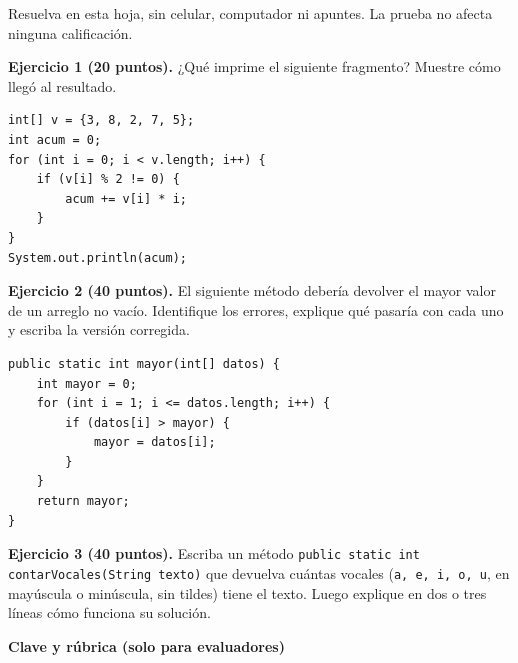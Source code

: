 \documentclass[12pt,letterpaper]{article}
\numberwithin{table}{section}
\numberwithin{figure}{section}
\begin{document}
Resuelva en esta hoja, sin celular, computador ni apuntes. La prueba no afecta ninguna calificación.

\textbf{Ejercicio 1 (20 puntos).} ¿Qué imprime el siguiente fragmento? Muestre cómo llegó al resultado.

\begin{lstlisting}
int[] v = {3, 8, 2, 7, 5};
int acum = 0;
for (int i = 0; i < v.length; i++) {
    if (v[i] % 2 != 0) {
        acum += v[i] * i;
    }
}
System.out.println(acum);
\end{lstlisting}

\textbf{Ejercicio 2 (40 puntos).} El siguiente método debería devolver el mayor valor de un arreglo no vacío. Identifique los errores, explique qué pasaría con cada uno y escriba la versión corregida.

\begin{lstlisting}
public static int mayor(int[] datos) {
    int mayor = 0;
    for (int i = 1; i <= datos.length; i++) {
        if (datos[i] > mayor) {
            mayor = datos[i];
        }
    }
    return mayor;
}
\end{lstlisting}

\textbf{Ejercicio 3 (40 puntos).} Escriba un método \texttt{public static int contarVocales(String texto)} que devuelva cuántas vocales (\texttt{a, e, i, o, u}, en mayúscula o minúscula, sin tildes) tiene el texto. Luego explique en dos o tres líneas cómo funciona su solución.

\medskip
\textbf{Clave y rúbrica (solo para evaluadores)}
\end{document}
